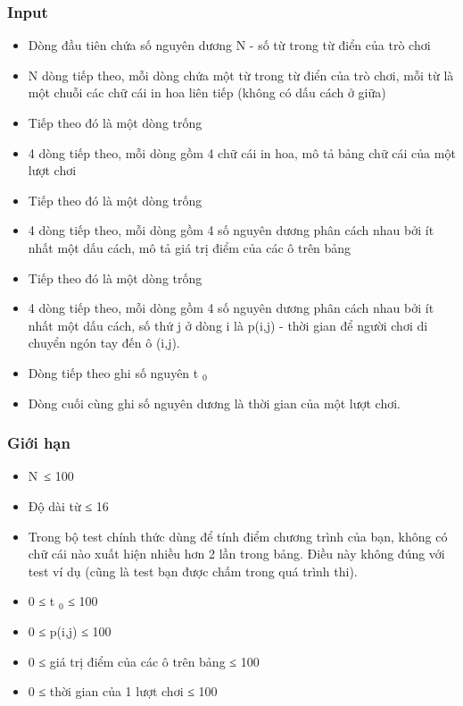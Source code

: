\subsubsection{Input}
\begin{itemize}
	\item Dòng đầu tiên chứa số nguyên dương N - số từ trong từ điển của trò chơi
	\item N dòng tiếp theo, mỗi dòng chứa một từ trong từ điển của trò chơi, mỗi từ là một chuỗi các chữ cái in hoa liên tiếp (không có dấu cách ở giữa)
	\item Tiếp theo đó là một dòng trống
	\item 4 dòng tiếp theo, mỗi dòng gồm 4 chữ cái in hoa, mô tả bảng chữ cái của một lượt chơi
	\item Tiếp theo đó là một dòng trống
	\item 4 dòng tiếp theo, mỗi dòng gồm 4 số nguyên dương phân cách nhau bởi ít nhất một dấu cách, mô tả giá trị điểm của các ô trên bảng
	\item Tiếp theo đó là một dòng trống
	\item 4 dòng tiếp theo, mỗi dòng gồm 4 số nguyên dương phân cách nhau bởi ít nhất một dấu cách, số thứ j ở dòng i là p(i,j) - thời gian để người chơi di chuyển ngón tay đến ô (i,j).
	\item Dòng tiếp theo ghi số nguyên t $_ 0 $
	\item Dòng cuối cùng ghi số nguyên dương là thời gian của một lượt chơi.
\end{itemize}

\subsubsection{Giới hạn}
\begin{itemize}
	\item N ≤ 100
	\item Độ dài từ ≤ 16
	\item Trong bộ test chính thức dùng để tính điểm chương trình của bạn, không có chữ cái nào xuất hiện nhiều hơn 2 lần trong bảng. Điều này không đúng với test ví dụ (cũng là test bạn được chấm trong quá trình thi).
	\item 0 ≤ t $_ 0 $ ≤ 100
	\item 0 ≤ p(i,j) ≤ 100
	\item 0 ≤ giá trị điểm của các ô trên bảng ≤ 100
	\item 0 ≤ thời gian của 1 lượt chơi ≤ 100
\end{itemize}

